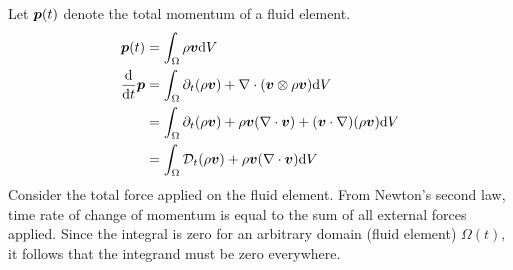 Let $\boldsymbol{p}(t)$ denote the total momentum of a fluid element.
\begin{equation}
\begin{split}
    \boldsymbol{p}(t) &= \int_{\Omega}\rho\boldsymbol{v}\mathrm{d} V \\
    \frac{\mathrm{d}}{\mathrm{d} t}\boldsymbol{p} &= \int_{\Omega}\partial_{t}(\rho\boldsymbol{v}) + \nabla\cdot(\boldsymbol{v}\otimes\rho\boldsymbol{v})   \mathrm{d} V \\
    &=\int_{\Omega}\partial_{t}(\rho\boldsymbol{v}) + \rho\boldsymbol{v}(\nabla\cdot\boldsymbol{v}) + (\boldsymbol{v}\cdot\nabla)(\rho\boldsymbol{v}) \mathrm{d} V \\
    &=\int_{\Omega}\mathcal{D}_t(\rho\boldsymbol{v}) + \rho\boldsymbol{v}(\nabla\cdot\boldsymbol{v}) \mathrm{d} V
\end{split}
\end{equation}
Consider the total force applied on the fluid element.
From Newton's second law, time rate of change of momentum is equal to the sum of all external forces applied.
Since the integral is zero for an arbitrary domain (fluid element) $\Omega(t),$ it follows that the integrand must be zero everywhere.

